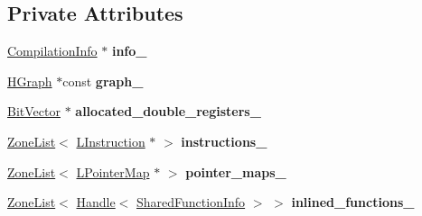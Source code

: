 \subsection*{Private Attributes}
\begin{DoxyCompactItemize}
\item 
\hyperlink{classv8_1_1internal_1_1_compilation_info}{Compilation\+Info} $\ast$ {\bfseries info\+\_\+}\hypertarget{classv8_1_1internal_1_1_l_chunk_a64ce60b4c90290faa5f16204dcf3715c}{}\label{classv8_1_1internal_1_1_l_chunk_a64ce60b4c90290faa5f16204dcf3715c}

\item 
\hyperlink{classv8_1_1internal_1_1_h_graph}{H\+Graph} $\ast$const {\bfseries graph\+\_\+}\hypertarget{classv8_1_1internal_1_1_l_chunk_a664910168b8cc616ed7cbd963bfacb51}{}\label{classv8_1_1internal_1_1_l_chunk_a664910168b8cc616ed7cbd963bfacb51}

\item 
\hyperlink{classv8_1_1internal_1_1_bit_vector}{Bit\+Vector} $\ast$ {\bfseries allocated\+\_\+double\+\_\+registers\+\_\+}\hypertarget{classv8_1_1internal_1_1_l_chunk_ac3ff7cb40fb31d1b4a2ce4fa5a5012f5}{}\label{classv8_1_1internal_1_1_l_chunk_ac3ff7cb40fb31d1b4a2ce4fa5a5012f5}

\item 
\hyperlink{classv8_1_1internal_1_1_zone_list}{Zone\+List}$<$ \hyperlink{classv8_1_1internal_1_1_l_instruction}{L\+Instruction} $\ast$ $>$ {\bfseries instructions\+\_\+}\hypertarget{classv8_1_1internal_1_1_l_chunk_a3bb471f84f0b0b132f4344fa554f128d}{}\label{classv8_1_1internal_1_1_l_chunk_a3bb471f84f0b0b132f4344fa554f128d}

\item 
\hyperlink{classv8_1_1internal_1_1_zone_list}{Zone\+List}$<$ \hyperlink{classv8_1_1internal_1_1_l_pointer_map}{L\+Pointer\+Map} $\ast$ $>$ {\bfseries pointer\+\_\+maps\+\_\+}\hypertarget{classv8_1_1internal_1_1_l_chunk_a755936da96eb67861ae056b742e21851}{}\label{classv8_1_1internal_1_1_l_chunk_a755936da96eb67861ae056b742e21851}

\item 
\hyperlink{classv8_1_1internal_1_1_zone_list}{Zone\+List}$<$ \hyperlink{classv8_1_1internal_1_1_handle}{Handle}$<$ \hyperlink{classv8_1_1internal_1_1_shared_function_info}{Shared\+Function\+Info} $>$ $>$ {\bfseries inlined\+\_\+functions\+\_\+}\hypertarget{classv8_1_1internal_1_1_l_chunk_ae734319aa20cdbee8a4cc6dd706049bc}{}\label{classv8_1_1internal_1_1_l_chunk_ae734319aa20cdbee8a4cc6dd706049bc}


\end{DoxyCompactItemize}
